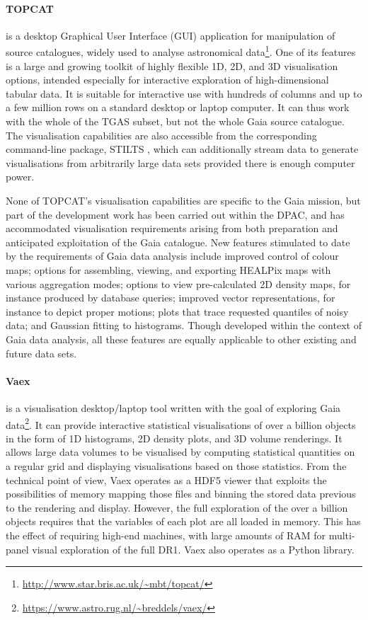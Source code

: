 \documentclass[longauth, final]{aa}
\begin{document}
\paragraph{TOPCAT}\citep{2005ASPC..347...29T} is a desktop Graphical User Interface (GUI) application for manipulation of source catalogues, widely used to analyse astronomical data\footnote{\url{http://www.star.bris.ac.uk/~mbt/topcat/}}.  One of its features is a large and growing toolkit of highly flexible 1D, 2D, and 3D visualisation options, intended especially for interactive exploration of high-dimensional tabular data. It is suitable for interactive use with hundreds of columns and up to a few million rows on a standard desktop or laptop computer. It can thus work with the whole of the TGAS subset, but not the whole Gaia source catalogue. The visualisation capabilities are also accessible from the corresponding command-line package, STILTS \citep{2006ASPC..351..666T}, which can additionally stream data to generate visualisations from arbitrarily large data sets provided there is  enough computer power.

None of TOPCAT's visualisation capabilities are specific to the Gaia mission, but part of the development work has been carried out within the DPAC, and has accommodated visualisation requirements arising from both preparation and anticipated exploitation of the Gaia catalogue. New features stimulated to date by the requirements of Gaia data analysis include improved control of colour maps; options for assembling, viewing, and exporting HEALPix maps with various aggregation modes; options to view pre-calculated 2D density maps, for instance produced by database queries; improved vector representations, for instance to depict proper motions; plots that trace requested quantiles of noisy data; and Gaussian fitting to histograms. Though developed within the context of Gaia data analysis, all these features are equally applicable to other existing and future data sets.

\paragraph{Vaex}\citep{2016arXiv161204183B} is a visualisation desktop/laptop tool written with the goal of exploring Gaia data\footnote{\url{https://www.astro.rug.nl/~breddels/vaex/}}. It can provide interactive statistical visualisations of over a billion objects in the form of 1D histograms, 2D density plots, and 3D volume renderings. It allows large data volumes to be visualised by computing statistical quantities on a regular grid and displaying visualisations based on those statistics. From the technical point of view, Vaex operates as a HDF5 viewer that exploits the possibilities of memory mapping those files and binning the stored data previous to the rendering and display. However, the full exploration of the over a billion objects requires that the variables of each plot are all loaded in memory. This has the effect of requiring high-end machines, with large amounts of RAM for multi-panel visual exploration of the full DR1. Vaex also operates as a Python library.
\end{document}
